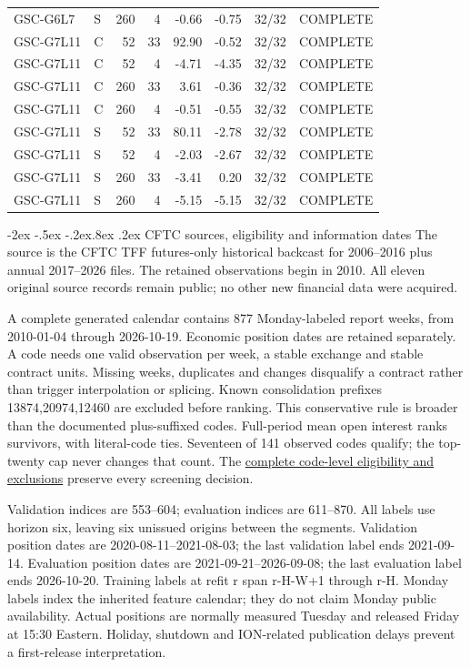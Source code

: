 \documentclass[10pt,a4paper]{article}
\makeatletter
\renewcommand\section{\@startsection{section}{1}{\z@}%
  {-2ex \@plus -.5ex \@minus -.2ex}{.8ex \@plus .2ex}%
  {\normalfont\large\bfseries}}
\makeatother
\begin{document}
\begin{longtable}{llrrrrrl}
GSC-G6L7 & S & 260 & 4 & -0.66 & -0.75 & 32/32 & COMPLETE \\
GSC-G7L11 & C & 52 & 33 & 92.90 & -0.52 & 32/32 & COMPLETE \\
GSC-G7L11 & C & 52 & 4 & -4.71 & -4.35 & 32/32 & COMPLETE \\
GSC-G7L11 & C & 260 & 33 & 3.61 & -0.36 & 32/32 & COMPLETE \\
GSC-G7L11 & C & 260 & 4 & -0.51 & -0.55 & 32/32 & COMPLETE \\
GSC-G7L11 & S & 52 & 33 & 80.11 & -2.78 & 32/32 & COMPLETE \\
GSC-G7L11 & S & 52 & 4 & -2.03 & -2.67 & 32/32 & COMPLETE \\
GSC-G7L11 & S & 260 & 33 & -3.41 & 0.20 & 32/32 & COMPLETE \\
GSC-G7L11 & S & 260 & 4 & -5.15 & -5.15 & 32/32 & COMPLETE \\
\bottomrule\end{longtable}\endgroup


\clearpage
\section{CFTC sources, eligibility and information dates}\label{sup:v10-cftc}
The source is the CFTC TFF futures-only historical backcast for 2006--2016 plus annual 2017--2026 files. The retained observations begin in 2010. All eleven original source records remain public; no other new financial data were acquired.

A complete generated calendar contains 877 Monday-labeled report weeks, from 2010-01-04 through 2026-10-19. Economic position dates are retained separately. A code needs one valid observation per week, a stable exchange and stable contract units. Missing weeks, duplicates and changes disqualify a contract rather than trigger interpolation or splicing. Known consolidation prefixes 13874,20974,12460 are excluded before ranking. This conservative rule is broader than the documented plus-suffixed codes. Full-period mean open interest ranks survivors, with literal-code ties. Seventeen of 141 observed codes qualify; the top-twenty cap never changes that count.
The \href{https://github.com/ByronLi0207/financial-mathematics-paper-20261020/blob/revision-v10b/results/v10/cftc/eligibility.json}{complete code-level eligibility and exclusions} preserve every screening decision.

Validation indices are 553--604; evaluation indices are 611--870. All labels use horizon six, leaving six unissued origins between the segments. Validation position dates are 2020-08-11--2021-08-03; the last validation label ends 2021-09-14. Evaluation position dates are 2021-09-21--2026-09-08; the last evaluation label ends 2026-10-20. Training labels at refit r span r-H-W+1 through r-H. Monday labels index the inherited feature calendar; they do not claim Monday public availability. Actual positions are normally measured Tuesday and released Friday at 15:30 Eastern. Holiday, shutdown and ION-related publication delays prevent a first-release interpretation.
\end{document}
